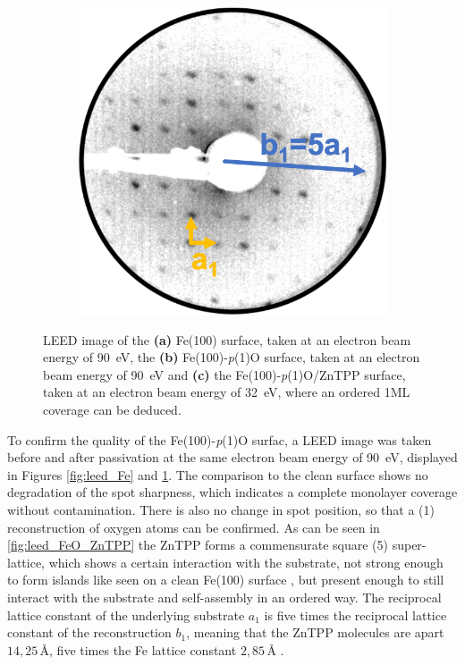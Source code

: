 \begin{figure}[h]
\begin{subfigure}{0.25\textwidth}
        \caption{}
        \label{fig:leed_FeO}
    \end{subfigure}
    \hfill
    \begin{subfigure}{0.25\textwidth}
        \includegraphics[width = \textwidth]{Plots/FeO_ZnTPP.png}
        \caption{}
        \label{fig:leed_FeO_ZnTPP}
    \end{subfigure}
    \caption{LEED image of the \textbf{(a)} Fe(100) surface, taken at an electron beam energy of \qty{90}{eV}, the \textbf{(b)} Fe(100)-\textit{p}(1)O surface, taken at an electron beam energy of \qty{90}{eV} and \textbf{(c)} the Fe(100)-\textit{p}(1)O/ZnTPP surface, taken at an electron beam energy of \qty{32}{eV}, where an ordered 1ML coverage can be deduced.}
    \label{fig:leed_1}
\end{figure}
\FloatBarrier

To confirm the quality of the Fe(100)-\textit{p}(1)O surfac, a LEED image was taken before and after passivation at the same electron beam energy of \qty{90}{eV}, displayed in Figures \ref{fig:leed_Fe} and \ref{fig:leed_FeO}.
The comparison to the clean surface shows no degradation of the spot sharpness, which indicates a complete monolayer coverage without contamination.
There is also no change in spot position, so that a (1) reconstruction of oxygen atoms can be confirmed.
As can be seen in \autoref{fig:leed_FeO_ZnTPP} the ZnTPP forms a commensurate square (5) super-lattice, which shows a certain interaction with the substrate, not strong enough to form islands like seen on a clean Fe(100) surface \cite*{bussetti_structure_2016}, but present enough to still interact with the substrate and self-assembly in an ordered way.
The reciprocal lattice constant of the underlying substrate $a_1$ is five times the reciprocal lattice constant of the reconstruction $b_1$, meaning that the ZnTPP molecules are apart $14,25\,$\r{A}, five times the Fe lattice constant $2,85\,$\r{A} \cite*{davey_precision_1925}.

